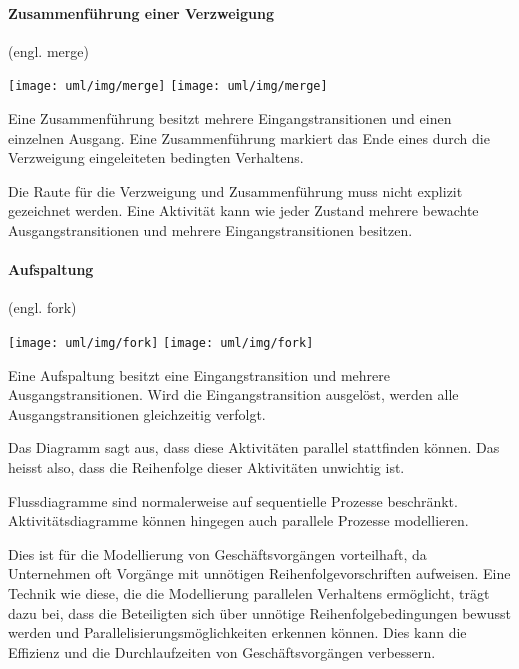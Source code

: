 \begin{minipage}[c]{0.45\linewidth}
\paragraph{Zusammenf\"uhrung einer Verzweigung} (engl. merge)\\[2ex]
\begin{minipage}[c]{0.29\linewidth}
\ifslides
\texttt{[image: uml/img/merge]}
\else
\texttt{[image: uml/img/merge]}
\fi
\end{minipage}
\begin{minipage}[c]{0.7\linewidth}
Eine Zusammenf\"uhrung besitzt mehrere Eingangstransitionen und
einen einzelnen Ausgang. Eine
Zusammenf\"uhrung markiert das Ende eines durch die Verzweigung
eingeleiteten bedingten Verhaltens.
\end{minipage}

Die Raute f\"ur die Verzweigung und Zusammenf\"uhrung muss
nicht explizit gezeichnet werden. Eine
Aktivit\"at kann wie jeder Zustand mehrere bewachte
 Ausgangstransitionen und mehrere Eingangstransitionen besitzen.
%
\ifslides
\newpage
\fi
\paragraph{Aufspaltung} (engl. fork)\\[2ex]
\begin{minipage}[c]{0.29\linewidth}
\ifslides
\texttt{[image: uml/img/fork]}
\else
\texttt{[image: uml/img/fork]}
\fi
\end{minipage}
\begin{minipage}[c]{0.7\linewidth}
Eine Aufspaltung besitzt eine Eingangstransition und
mehrere Ausgangstransitionen. Wird die
Eingangstransition ausgel\"ost, werden alle Ausgangstransitionen
gleichzeitig verfolgt.
\end{minipage}

Das Diagramm sagt aus, dass diese Aktivit\"aten parallel
stattfinden k\"onnen. Das heisst also,
dass die Reihenfolge dieser Aktivit\"aten unwichtig ist.

Flussdiagramme sind normalerweise auf sequentielle Prozesse
beschr\"ankt. Aktivit\"ats\-dia\-gramme
k\"onnen hingegen auch parallele Prozesse modellieren.

Dies ist f\"ur die Modellierung von Gesch\"aftsvorg\"angen
vorteilhaft, da Unternehmen oft
Vorg\"ange mit unn\"otigen Reihenfolgevorschriften aufweisen.
Eine Technik wie diese, die die
Modellierung parallelen Verhaltens erm\"oglicht, tr\"agt dazu bei,
dass die Beteiligten sich
\"uber unn\"otige Reihenfolgebedingungen bewusst werden und
Parallelisierungsm\"oglichkeiten
erkennen k\"onnen. Dies kann die Effizienz und die
Durchlaufzeiten von Gesch\"aftsvorg\"angen
verbessern.
%
\newpage

\end{minipage}
